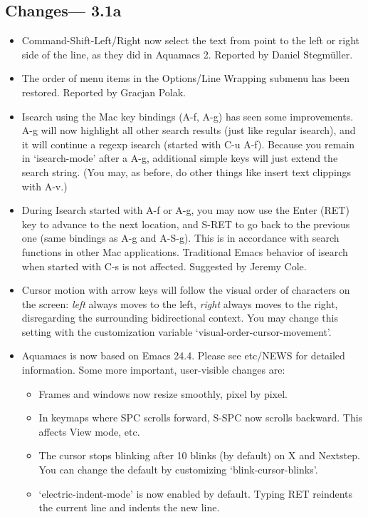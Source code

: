 \subsection{Changes--- 3.1a}
\begin{itemize}
\item Command-Shift-Left/Right now select the text from point to the left or right side of the line, as they did in Aquamacs 2.
Reported by Daniel Stegm\"uller.
\item The order of menu items in the Options/Line Wrapping submenu has been restored.
Reported by Gracjan Polak.
\item Isearch using the Mac key bindings (A-f, A-g) has seen some improvements.  A-g will now highlight all other search results (just like regular isearch), and it will continue a regexp isearch (started with C-u A-f).  Because you remain in `isearch-mode' after a A-g, additional simple keys will just extend the search string.  (You may, as before, do other things like insert text clippings with A-v.)
\item During Isearch started with A-f or A-g, you may now use the Enter (RET) key to advance to the next location, and S-RET to go back to the previous one (same bindings as A-g and A-S-g).  This is in accordance with search functions in other Mac applications.  Traditional Emacs behavior of isearch when started with C-s is not affected.
Suggested by Jeremy Cole.
\item Cursor motion with arrow keys will follow the
visual order of characters on the screen: \emph{left} always moves to the
left, \emph{right} always moves to the right, disregarding the surrounding
bidirectional context.  You may change this setting with the customization variable `visual-order-cursor-movement'.
\item Aquamacs is now based on Emacs 24.4.  Please see etc/NEWS for detailed information.  Some more important, user-visible changes are:
\begin{itemize}
\item Frames and windows now resize smoothly, pixel by pixel.
\item In keymaps where SPC scrolls forward, S-SPC now scrolls backward.
This affects View mode, etc.
\item The cursor stops blinking after 10 blinks (by default) on X and Nextstep.
You can change the default by customizing `blink-cursor-blinks'.
\item `electric-indent-mode' is now enabled by default.
Typing RET reindents the current line and indents the new line.

\end{itemize}
\end{itemize}
